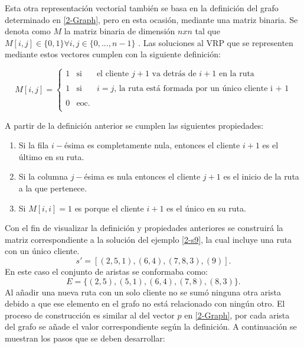 Esta otra representación vectorial también se basa en la definición del grafo determinado en \ref{2-Graph}, pero en esta ocasión, mediante una matriz binaria. Se denota como $M$ la matriz binaria de dimensión $nxn$ tal que $M[i, j] \in \{0, 1\} \forall i, j \in \{0, ..., n-1\}$ . Las soluciones al VRP que se representen mediante estos vectores cumplen con la siguiente definición: 

\[M[i, j]=\left\{
\begin{array}{rcl}
\label{2-Mdef}
1 & \mbox{si} & \text{el cliente $j + 1$ va detrás de $i + 1$ en la ruta}\\
&
& \\
1 & \mbox{si} & \text{$i = j$, la ruta está formada por un único cliente i + 1}  \\
&
& \\
0 & \mbox{eoc}.  \\
\end{array}
\right. \]

A partir de la definición anterior se cumplen las siguientes propiedades:
\begin{enumerate}
	\item Si la fila $i-$ésima es completamente nula, entonces el cliente $i+1$ es el último en su ruta.
	\item Si la columna $j-$ésima es nula entonces el cliente $j+1$ es el inicio de la ruta a la que pertenece.
	\item Si $M[i, i] = 1$ es porque el cliente $i + 1$ es el único en su ruta.
\end{enumerate}

Con el fin de visualizar la definición y propiedades anteriores se construirá la matriz correspondiente a la solución del ejemplo \ref{2-s9}, la cual incluye una ruta con un único cliente.
\begin{equation*}
\label{2-s9M}
s' = [(2, 5, 1), (6, 4), (7, 8, 3), (9)].
\end{equation*}
En este caso el conjunto de aristas se conformaba como:
 \begin{equation*}
 \label{2-Es9}
 E = \{(2, 5), (5, 1), (6, 4), (7, 8), (8, 3)\}.
 \end{equation*}
 Al añadir una nueva ruta con un solo cliente no se sumó ninguna otra arista debido a que ese elemento en el grafo no está relacionado con ningún otro.  El proceso de construcción es similar al del vector $p$ en \ref{2-Graph}, por cada arista del grafo se añade el valor correspondiente según la definición. A continuación se muestran los pasos que se deben desarrollar:
 
